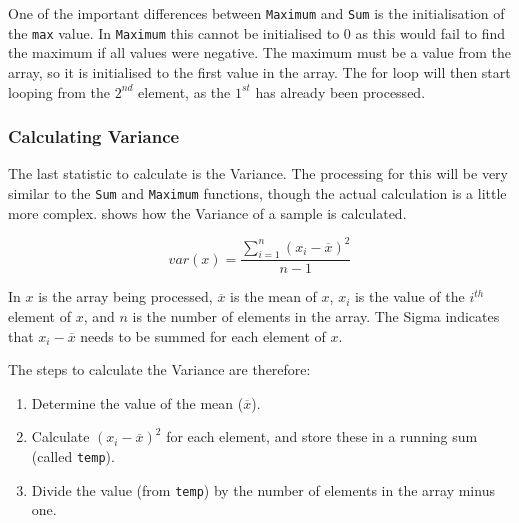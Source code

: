 One of the important differences between \texttt{Maximum} and \texttt{Sum} is the initialisation of the \texttt{max} value. In \texttt{Maximum} this cannot be initialised to 0 as this would fail to find the maximum if all values were negative. The maximum must be a value from the array, so it is initialised to the first value in the array. The for loop will then start looping from the $2^{nd}$ element, as the $1^{st}$ has already been processed.


% 


\clearpage
\subsubsection{Calculating Variance} %
\label{ssub:calculating_variance}

The last statistic to calculate is the Variance. The processing for this will be very similar to the \texttt{Sum} and \texttt{Maximum} functions, though the actual calculation is a little more complex.  shows how the Variance of a sample is calculated.

\begin{equation}
  \label{eq:var}
  var(x) = \frac{\displaystyle \sum_{i=1}^{n}(x_{i} - \overline{x})^2}{n - 1}
\end{equation}

In  $x$ is the array being processed, $\overline{x}$ is the mean of $x$, $x_i$ is the value of the $i^{th}$ element of $x$, and $n$ is the number of elements in the array. The Sigma indicates that $x_{i} - \overline{x}$ needs to be summed for each element of $x$.

The steps to calculate the Variance are therefore:
\begin{enumerate}
  \item Determine the value of the mean ($\overline{x}$).
  \item Calculate $(x_{i} - \overline{x})^2$ for each element, and store these in a running sum (called \texttt{temp}).
  \item Divide the value (from \texttt{temp}) by the number of elements in the array minus one.
\end{enumerate}

